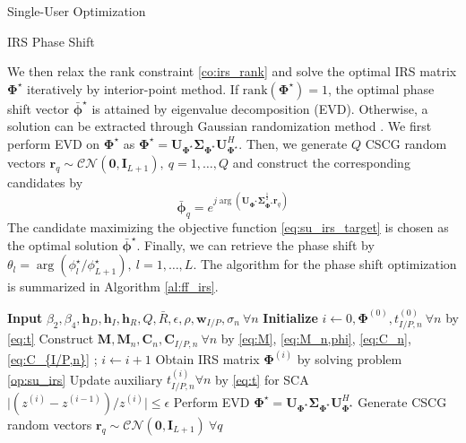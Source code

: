 \documentclass{IEEEtran}
\begin{document}
\begin{section}{Single-User Optimization}
\begin{subsection}{IRS Phase Shift}
\begin{maxi!}
			\end{maxi!}
		We then relax the rank constraint \ref{co:irs_rank} and solve the optimal IRS matrix $\boldsymbol{\Phi}^{\star}$ iteratively by interior-point method. If $\mathrm{rank}(\boldsymbol{\Phi}^{\star})=1$, the optimal phase shift vector $\bar{\boldsymbol{\phi}}^\star$ is attained by eigenvalue decomposition (EVD). Otherwise, a solution can be extracted through Gaussian randomization method \cite{Huang2010}. We first perform EVD on $\boldsymbol{\Phi}^{\star}$ as $\boldsymbol{\Phi}^{\star}=\boldsymbol{U}_{\boldsymbol{\Phi}^{\star}}\boldsymbol{\Sigma}_{\boldsymbol{\Phi}^{\star}}\boldsymbol{U}_{\boldsymbol{\Phi}^{\star}}^H$. Then, we generate $Q$ CSCG random vectors $\boldsymbol{r}_q \sim \mathcal{CN}(\boldsymbol{0},\boldsymbol{I}_{L+1}),\ q=1,\dots,Q$ and construct the corresponding candidates by
		\begin{equation}
			\bar{\boldsymbol{\phi}}_q=e^{j\arg\left(\boldsymbol{U}_{\boldsymbol{\Phi}^{\star}}\boldsymbol{\Sigma}_{\boldsymbol{\Phi}^{\star}}^{\frac{1}{2}}\boldsymbol{r}_q\right)}
		\end{equation}
		The candidate maximizing the objective function \ref{eq:su_irs_target} is chosen as the optimal solution $\bar{\boldsymbol{\phi}}^\star$. Finally, we can retrieve the phase shift by $\theta_l=\arg(\phi_l^\star/\phi_{L+1}^\star), \ l=1,\dots,L$. The algorithm for the phase shift optimization is summarized in Algorithm \ref{al:ff_irs}.
		\begin{algorithm}
			\caption{IRS Phase Shift}
			\label{al:ff_irs}
			\begin{algorithmic}[1]
				\State \textbf{Input} $\beta_2,\beta_4,\boldsymbol{h}_D,\boldsymbol{h}_I,\boldsymbol{h}_R,Q,\bar{R},\epsilon,\rho,\boldsymbol{w}_{I/P},\sigma_n \ \forall n$
				\State \textbf{Initialize} $i \gets 0,\boldsymbol{\Phi}^{(0)},t_{I/P,n}^{(0)}\ \forall n$ by \ref{eq:t}
				\State Construct $\boldsymbol{M},\boldsymbol{M}_n,\boldsymbol{C}_{n},\boldsymbol{C}_{I/P,n} \ \forall n$ by \ref{eq:M}, \ref{eq:M_n,phi}, \ref{eq:C_n}, \ref{eq:C_{I/P,n}}
				\Repeat;
				\State $i \gets i + 1$
				\State Obtain IRS matrix $\boldsymbol{\Phi}^{(i)}$ by solving problem \ref{op:su_irs}
				\State Update auxiliary $t_{I/P,n}^{(i)} \forall n$ by \ref{eq:t} for SCA
				\Until $\lvert (z^{(i)}-z^{(i-1)}) / z^{(i)} \rvert \le \epsilon$
				\State Perform EVD $\boldsymbol{\Phi}^{\star}=\boldsymbol{U}_{\boldsymbol{\Phi}^{\star}}\boldsymbol{\Sigma}_{\boldsymbol{\Phi}^{\star}}\boldsymbol{U}_{\boldsymbol{\Phi}^{\star}}^H$
				\State Generate CSCG random vectors $\boldsymbol{r}_q \sim \mathcal{CN}(\boldsymbol{0},\boldsymbol{I}_{L+1}) \ \forall q$

\end{algorithmic}
\end{algorithm}
\end{subsection}
\end{section}
\end{document}
